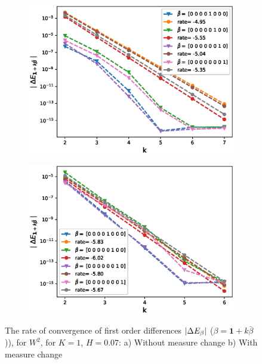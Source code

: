 \documentclass[11pt]{article}
\begin{document}
 \begin{figure}[h!]
 	\centering
 	\begin{subfigure}{.4\textwidth}
 		\centering
 		\includegraphics[width=1\linewidth]{./figures/rBergomi_mixed_error_rates/without_change_measure/N_4/H_007/first_difference_rbergomi_4steps_H_007_K_1_totally_hierarch_with_rate_W2}
 		\caption{}
 		\label{fig:sub3}
 	\end{subfigure}%
 	\begin{subfigure}{.4\textwidth}
 		\centering
 		\includegraphics[width=1\linewidth]{./figures/rBergomi_mixed_error_rates/partial_change_measure/N_4/H_007/first_difference_rbergomi_4steps_H_007_K_1_totally_hierarch_with_rate_W2_change_measure_part_spec}
 		\caption{}
 		\label{fig:sub4}
 	\end{subfigure}
 	
 	\caption{The rate of convergence of  first order differences $\left\lvert\Delta E_{\beta}\right\rvert$ ($\beta=\mathbf{1}+k \bar{\beta}$)), for $W^2$, for $K=1$, $H=0.07$: a) Without measure change b) With measure change}
 	\label{fig:first_diff_comp_K_1_H_007_W_2}
 \end{figure}
 
\end{document}
